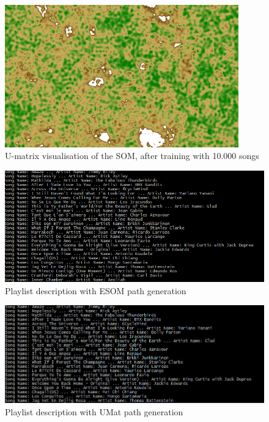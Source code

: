 \begin{figure}[h!]
    \centering
    \includegraphics[angle=90, width=0.9\textwidth]{figures/map.jpg}
    \caption{U-matrix visualisation of the SOM, after training with 10.000 songs}
    \label{fig:map}
\end{figure}

\begin{figure}[h]
    \centering
    \includegraphics[width=\textwidth]{figures/ESOMSongs.PNG}
    \caption{Playlist description with ESOM path generation}
    \label{fig:esomres}
\end{figure}

\begin{figure}[h]
    \centering
    \includegraphics[width=\textwidth]{figures/UMatSongs.PNG}
    \caption{Playlist description with UMat path generation}
    \label{fig:umatres}
\end{figure}
